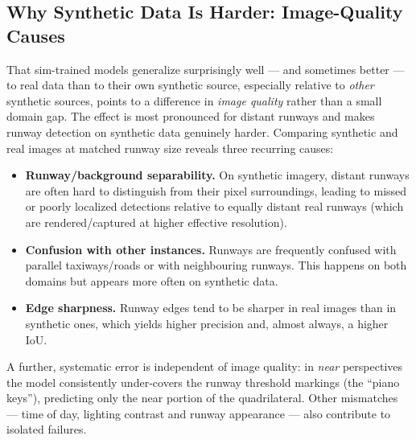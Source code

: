 \subsection{Why Synthetic Data Is Harder: Image-Quality Causes}
\label{subsec:gap-quality}
That sim-trained models generalize surprisingly well --- and sometimes better --- to
real data than to their own synthetic source, especially relative to \emph{other}
synthetic sources, points to a difference in \emph{image quality} rather than a small
domain gap. The effect is most pronounced for distant runways and makes runway
detection on synthetic data genuinely harder. Comparing synthetic and real images at
matched runway size reveals three recurring causes:
\begin{itemize}
    \item \textbf{Runway/background separability.} On synthetic imagery, distant
    runways are often hard to distinguish from their pixel surroundings, leading to
    missed or poorly localized detections relative to equally distant real runways
    (which are rendered/captured at higher effective resolution).
    \item \textbf{Confusion with other instances.} Runways are frequently confused
    with parallel taxiways/roads or with neighbouring runways. This happens on both
    domains but appears more often on synthetic data.
    \item \textbf{Edge sharpness.} Runway edges tend to be sharper in real images than
    in synthetic ones, which yields higher precision and, almost always, a higher IoU.
\end{itemize}
A further, systematic error is independent of image quality: in \emph{near}
perspectives the model consistently under-covers the runway threshold markings (the
``piano keys''), predicting only the near portion of the quadrilateral. Other
mismatches --- time of day, lighting contrast and runway appearance --- also
contribute to isolated failures.


